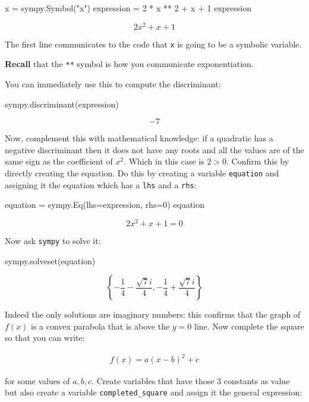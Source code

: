 \begin{pyin}
x = sympy.Symbol("x")
expression = 2 * x ** 2 + x + 1
expression
\end{pyin}

\[
2 x^{2} + x + 1
\]


The first line communicates to the code that \texttt{x} is going to be a symbolic variable.

\begin{note}
\textbf{Recall} that the \texttt{**} symbol is how you communicate exponentiation.
\end{note}

You can immediately use this to compute the discriminant:

\begin{pyin}
sympy.discriminant(expression)
\end{pyin}

\[-7\]

Now, complement this with mathematical knowledge: if a quadratic has a
negative discriminant then it does not have any roots and all the values are of
the same sign as the coefficient of \(x ^ 2 \). Which in this case is \(2>0\).
Confirm this by directly creating the equation. Do this by creating a
variable \texttt{equation} and assigning it the equation which has a
\texttt{lhs} and a \texttt{rhs}:

\begin{pyin}
equation = sympy.Eq(lhs=expression, rhs=0)
equation
\end{pyin}

\[2 x^{2} + x + 1 = 0\]

Now ask \texttt{sympy} to solve it:

\begin{pyin}
sympy.solveset(equation)
\end{pyin}

\[\left\{- \frac{1}{4} - \frac{\sqrt{7} i}{4}, - \frac{1}{4} + \frac{\sqrt{7} i}{4}\right\}\]

Indeed the only solutions are imaginary numbers: this confirms that the graph of
\(f(x)\) is a convex parabola that is above the \(y=0\) line.
Now complete the square so that you can write:

\begin{equation*}
\begin{split}
    f(x) = a (x - b) ^ 2 + c
\end{split}
\end{equation*}

for some values of \(a, b, c\).
Create variables that have those 3 constants as value but also create a variable \texttt{completed\_square} and assign it the general expression:

